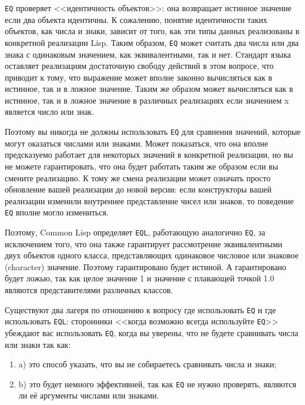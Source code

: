 \lstinline{EQ} проверяет <<идентичность объектов>>: она возвращает истинное значение если два
объекта идентичны. К сожалению, понятие идентичности таких объектов, как числа и знаки,
зависит от того, как эти типы данных реализованы в конкретной реализации Lisp. Таким
образом, \lstinline{EQ} может считать два числа или два знака с одинаковым значением, как
эквивалентными, так и нет. Стандарт языка оставляет реализациям достаточную свободу
действий в этом вопросе, что приводит к тому, что выражение  может вполне
законно вычисляться как в истинное, так и в ложное значение. Таким же образом  может вычисляться как в истинное, так и в ложное значение в различных реализациях
если значением x является число или знак.

Поэтому вы никогда не должны использовать \lstinline{EQ} для сравнения значений, которые
могут оказаться числами или знаками. Может показаться, что она вполне предсказуемо
работает для некоторых значений в конкретной реализации, но вы не можете гарантировать,
что она будет работать таким же образом если вы смените реализацию. К тому же смена
реализации может означать просто обновление вашей реализации до новой версии: если
конструкторы вашей реализации изменили внутреннее представление чисел или знаков, то
поведение \lstinline{EQ} вполне могло измениться.

Поэтому, Common Lisp определяет \lstinline{EQL}, работающую аналогично \lstinline{EQ}, за
исключением того, что она также гарантирует рассмотрение эквивалентными двух объектов
одного класса, представляющих одинаковое числовое или знаковое (character)
значение. Поэтому  гарантировано будет истиной. А 
гарантировано будет ложью, так как целое значение 1 и значение с плавающей точкой 1.0
являются представителями различных классов.

Существуют два лагеря по отношению к вопросу где использовать \lstinline{EQ} и где
использовать \lstinline{EQL}: сторонники <<когда возможно всегда используйте \lstinline{EQ}>>
убеждают вас использовать \lstinline{EQ}, когда вы уверены, что не будете сравнивать числа
или знаки так как:

\begin{enumerate}
\item a) это способ указать, что вы не собираетесь сравнивать числа и знаки; 

\item b) это будет немного эффективней, так как \lstinline{EQ} не нужно проверять, являются
  ли её аргументы числами или знаками.
\end{enumerate}


